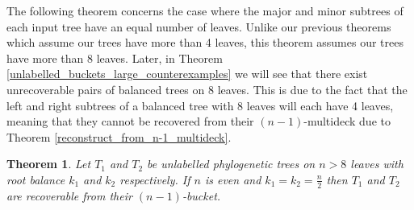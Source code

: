 \documentclass[12pt]{article}
\newtheorem{Theorem}{Theorem}[section]
\theoremstyle{definition}
\begin{document}
The following theorem concerns the case where the major and minor subtrees of each input tree have an equal number of leaves. Unlike our previous theorems which assume our trees have more than 4 leaves, this theorem assumes our trees have more than 8 leaves. Later, in Theorem \ref{unlabelled_buckets_large_counterexamples} we will see that there exist unrecoverable pairs of balanced trees on 8 leaves. This is due to the fact that the left and right subtrees of a balanced tree with 8 leaves will each have 4 leaves, meaning that they cannot be recovered from their $(n-1)$-multideck due to Theorem \ref{reconstruct_from_n-1_multideck}.

\begin{Theorem}\label{unlabelled_buckets_theorem3}
    Let $T_1$ and $T_2$ be unlabelled phylogenetic trees on $n>8$ leaves with root balance $k_1$ and $k_2$ respectively. If $n$ is even and $k_1 = k_2 = \frac{n}{2}$ then $T_1$ and $T_2$ are recoverable from their $(n-1)$-bucket.
\end{Theorem}
\end{document}
